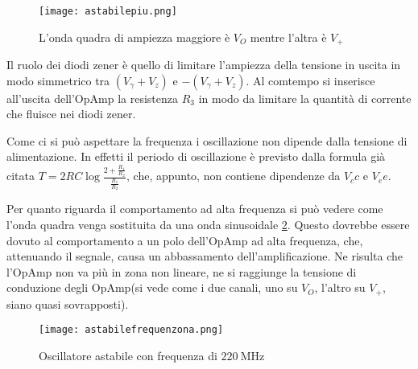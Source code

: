 \begin{figure}[h]
	\centering
	\texttt{[image: astabilepiu.png]}
	\caption{L'onda quadra di ampiezza maggiore è $V_O$ mentre l'altra è $V_+$}
	\label{f:astabile+}
\end{figure}

Il ruolo dei diodi zener è quello di limitare l'ampiezza della tensione in uscita in modo simmetrico tra $(V_\gamma + V_z)$ e $-(V_\gamma + V_z)$. Al comtempo si inserisce all'uscita dell'OpAmp la resistenza $R_3$ in modo da limitare la quantità di corrente che fluisce nei diodi zener.


Come ci si può aspettare la frequenza i oscillazione non dipende dalla tensione di alimentazione. In effetti il periodo di oscillazione è previsto dalla formula già citata $T=2RC\log\frac{2+\frac{R_1}{R_2}}{\frac{R_1}{R_2}}$, che, appunto, non contiene dipendenze da $V_cc$ e $V_ee$.


Per quanto riguarda il comportamento ad alta frequenza si può vedere come l'onda quadra venga sostituita da una onda sinusoidale \ref{f:freqzona}. Questo dovrebbe essere dovuto al comportamento a un polo dell'OpAmp ad alta frequenza, che, attenuando il segnale, causa un abbassamento dell'amplificazione. Ne risulta che l'OpAmp non va più in zona non lineare, ne si raggiunge la tensione di conduzione degli OpAmp(si vede come i due canali, uno su $V_O$, l'altro su $V_+$, siano quasi sovrapposti). 

\begin{figure}[h]
	\centering
	\texttt{[image: astabilefrequenzona.png]}
	\caption{Oscillatore astabile con frequenza di $\SI{220}{\mega\Hz}$}
	\label{f:freqzona}
\end{figure}